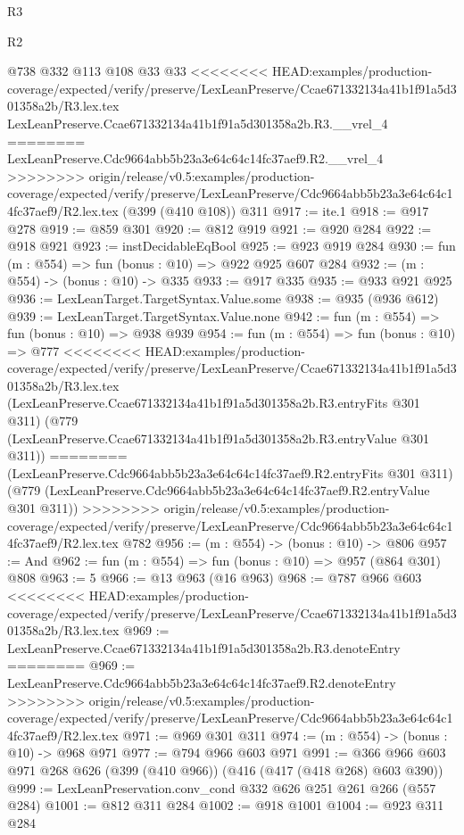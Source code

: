 \begin{lexlean}{R3}
\begin{lexlean}{R2}
\begin{coremodule}
{{{{{{{{{{{{{{{{{{{{{{    @738
    @332
    @113
    @108
    @33
    @33
<<<<<<<< HEAD:examples/production-coverage/expected/verify/preserve/LexLeanPreserve/Ccae671332134a41b1f91a5d301358a2b/R3.lex.tex
    LexLeanPreserve.Ccae671332134a41b1f91a5d301358a2b.R3.__vrel_4
========
    LexLeanPreserve.Cdc9664abb5b23a3e64c64c14fc37aef9.R2.__vrel_4
>>>>>>>> origin/release/v0.5:examples/production-coverage/expected/verify/preserve/LexLeanPreserve/Cdc9664abb5b23a3e64c64c14fc37aef9/R2.lex.tex
    (@399 (@410 @108))
    @311
@917 := ite.{1}
@918 := @917 @278
@919 := @859 @301
@920 := @812 @919
@921 := @920 @284
@922 := @918 @921
@923 := instDecidableEqBool
@925 := @923 @919 @284
@930 := fun (m : @554) => fun (bonus : @10) => @922 @925 @607 @284
@932 := (m : @554) -> (bonus : @10) -> @335
@933 := @917 @335
@935 := @933 @921 @925
@936 := LexLeanTarget.TargetSyntax.Value.some
@938 := @935 (@936 @612)
@939 := LexLeanTarget.TargetSyntax.Value.none
@942 := fun (m : @554) => fun (bonus : @10) => @938 @939
@954 := fun (m : @554) =>
  fun (bonus : @10) =>
  @777
<<<<<<<< HEAD:examples/production-coverage/expected/verify/preserve/LexLeanPreserve/Ccae671332134a41b1f91a5d301358a2b/R3.lex.tex
    (LexLeanPreserve.Ccae671332134a41b1f91a5d301358a2b.R3.entryFits @301 @311)
    (@779 (LexLeanPreserve.Ccae671332134a41b1f91a5d301358a2b.R3.entryValue @301 @311))
========
    (LexLeanPreserve.Cdc9664abb5b23a3e64c64c14fc37aef9.R2.entryFits @301 @311)
    (@779 (LexLeanPreserve.Cdc9664abb5b23a3e64c64c14fc37aef9.R2.entryValue @301 @311))
>>>>>>>> origin/release/v0.5:examples/production-coverage/expected/verify/preserve/LexLeanPreserve/Cdc9664abb5b23a3e64c64c14fc37aef9/R2.lex.tex
    @782
@956 := (m : @554) -> (bonus : @10) -> @806
@957 := And
@962 := fun (m : @554) => fun (bonus : @10) => @957 (@864 @301) @808
@963 := 5
@966 := @13 @963 (@16 @963)
@968 := @787 @966 @603
<<<<<<<< HEAD:examples/production-coverage/expected/verify/preserve/LexLeanPreserve/Ccae671332134a41b1f91a5d301358a2b/R3.lex.tex
@969 := LexLeanPreserve.Ccae671332134a41b1f91a5d301358a2b.R3.denoteEntry
========
@969 := LexLeanPreserve.Cdc9664abb5b23a3e64c64c14fc37aef9.R2.denoteEntry
>>>>>>>> origin/release/v0.5:examples/production-coverage/expected/verify/preserve/LexLeanPreserve/Cdc9664abb5b23a3e64c64c14fc37aef9/R2.lex.tex
@971 := @969 @301 @311
@974 := (m : @554) -> (bonus : @10) -> @968 @971
@977 := @794 @966 @603 @971
@991 := @366 @966 @603 @971 @268 @626 (@399 (@410 @966)) (@416 (@417 (@418 @268) @603 @390))
@999 := LexLeanPreservation.conv_cond @332 @626 @251 @261 @266 (@557 @284)
@1001 := @812 @311 @284
@1002 := @918 @1001
@1004 := @923 @311 @284
}}}}}}}}}}}}}}}}}}}}}}
\end{coremodule}
\end{lexlean}
\end{lexlean}
